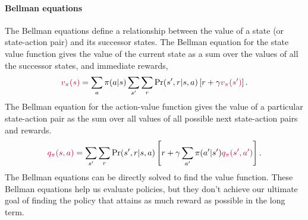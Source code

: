\documentclass[12pt]{article}
\begin{document}
\paragraph{Bellman equations} The Bellman equations define a relationship between the value of a state (or state-action pair) and its successor states. The Bellman equation for the state value function gives the value of the current state as a sum over the values of all the successor states, and immediate rewards,
\[
  \color{purple} v_\pi(s) \color{black} = \sum_a \pi(a|s) \sum_{s'} \sum_r \Pr(s',r|s,a) \left[ r + \gamma   \color{purple} v_\pi(s') \color{black} \right].
\]
The Bellman equation for the action-value function gives the value of a particular state-action pair as the sum over all values of all possible next state-action pairs and rewards.
\[
  \color{purple} q_\pi(s,a) \color{black} = \sum_{s'} \sum_r \Pr(s',r|s,a) \left[ r + \gamma \sum_{a'} \pi(a'|s')  \color{purple} q_\pi(s',a') \color{black} \right].
\]
The Bellman equations can be directly solved to find the value function. These Bellman equations help us evaluate policies, but they don't achieve our ultimate goal of finding the policy that attains as much reward as possible in the long term.
\end{document}
